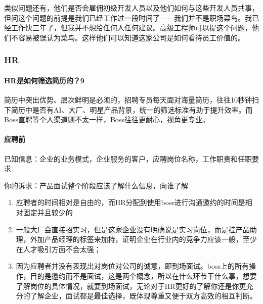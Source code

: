 \documentclass[letterpaper,11pt,english]{sphinxmanual}
\begin{document}
类似问题还有，他们是否会雇佣初级开发人员以及他们如何与这些开发人员共事，但问这个问题的前提是我们已经工作过一段时间了——我们并不是职场菜鸟。我已经工作快三年了，但我并不想给任何人任何建议。高级工程师可以提这个问题，他们不容易被误认为菜鸟。这样他们可以知道这家公司是如何看待员工价值的。


\subsubsection{HR}
\label{\detokenize{chapter_interview/HR:hr}}\label{\detokenize{chapter_interview/HR::doc}}

\paragraph{HR是如何筛选简历的？9\sphinxfootnotemark[774]}
\label{\detokenize{chapter_interview/HR:hr-9}}%
\begin{footnotetext}[774]\sphinxAtStartFootnote
{}
%
\end{footnotetext}\ignorespaces 
简历中突出优势、层次鲜明是必须的，招聘专员每天面对海量简历，往往10秒钟扫下简历中是否有AI、大厂、明星产品背景，统一的筛选标准有助于提升效率。而Boss直聘等个人渠道则不太一样，Boss往往更耐心，视角更专业。


\paragraph{应聘前}
\label{\detokenize{chapter_interview/HR:id1}}
已知信息：企业的业务模式，企业服务的客户，应聘岗位名称，工作职责和任职要求

你的诉求：产品面试整个阶段应该了解什么信息，向谁了解
\begin{enumerate}
%
\item {} 
应聘者的时间相对是自由的，而HR分配到使用boss进行沟通邀约的时间是相对固定并且较少的
%
\begin{footnote}[775]\sphinxAtStartFootnote
{}
%
\end{footnote}

\item {} 
一般大厂会直接招实习，但是这家企业没有明确说是实习岗位，而是挂产品助理，外加产品经理的标签来加持，证明企业在行业内的竞争力应该一般，至少在人才吸引方面不会太强；

\item {} 
因为应聘者并没有表现出对岗位对公司的诚意，即到场面试。boss上的所有操作，目的是邀约而不是面试，这是两个概念，所以在什么环节干什么事，想要了解岗位的具体情况，就要到场面试，无论对于HR更好的了解你还是你更充分的了解企业，面试都是最佳选择，既体现尊重又便于双方高效的相互判断。

\end{enumerate}
\end{document}
